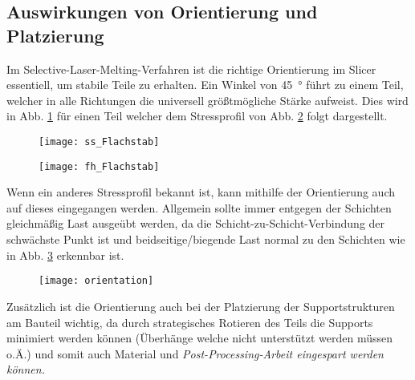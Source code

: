 \documentclass[../main.tex]{subfiles}
\begin{document}
\subsection{Auswirkungen von Orientierung und Platzierung}
Im Selective-Laser-Melting-Verfahren ist die richtige Orientierung im Slicer essentiell, um stabile Teile zu erhalten.
Ein Winkel von \qty{45}{\degree} führt zu einem Teil, welcher in alle Richtungen die universell größtmögliche Stärke aufweist. Dies wird in Abb. \ref{img:ss_1} für einen Teil welcher dem Stressprofil von Abb. \ref{img:fh_1} folgt dargestellt. 
\begin{figure}[H]
	\centering
	\texttt{[image: ss\_Flachstab]}
	\label{img:ss_1}
\end{figure}
\begin{figure}[H]
	\centering
	\texttt{[image: fh\_Flachstab]}
	\label{img:fh_1}
\end{figure}

Wenn ein anderes Stressprofil bekannt ist, kann mithilfe der Orientierung auch auf dieses eingegangen werden. Allgemein sollte immer entgegen der Schichten gleichmäßig Last ausgeübt werden, da die Schicht-zu-Schicht-Verbindung der schwächste Punkt ist und beidseitige/biegende Last normal zu den Schichten wie in Abb. \ref{img:orient_1} erkennbar ist.

\begin{figure}[H]
	\centering
	\texttt{[image: orientation]}
	\label{img:orient_1}
\end{figure}
Zusätzlich ist die Orientierung auch bei der Platzierung der Supportstrukturen am Bauteil wichtig, da durch strategisches Rotieren des Teils die Supports minimiert werden können (Überhänge welche nicht unterstützt werden müssen o.Ä.) und somit auch Material und \it{Post-Processing}-Arbeit eingespart werden können. 
\end{document}
